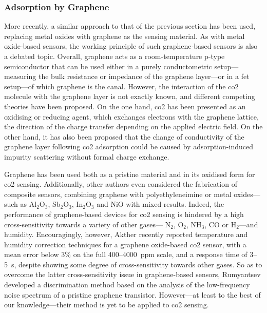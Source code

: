 \subsubsection{Adsorption by Graphene}\label{subsect:choos:review:graphene}

More recently, a similar approach to that of the previous section has been used, replacing metal oxides with graphene as the sensing material\cite{amin2014, singh2017}. As with metal oxide-based sensors, the working principle of such graphene-based sensors is also a debated topic. Overall, graphene acts as a room-temperature p-type semiconductor that can be used either in a purely conductometric setup---measuring the bulk resistance or impedance of the graphene layer\cite{yoon2011, zhou2014, akhter2021}---or in a \gls{fet} setup---of which graphene is the canal\cite{lu2009}. However, the interaction of the \gls{co2} molecule with the graphene layer is not exactly known, and different competing theories have been proposed. On the one hand, \gls{co2} has been presented as an oxidising or reducing agent, which exchanges electrons with the graphene lattice, the direction of the charge transfer depending on the applied electric field\cite{muruganathan2015}. On the other hand, it has also been proposed that the change of conductivity of the graphene layer following \gls{co2} adsorption could be caused by adsorption-induced impurity scattering without formal charge exchange\cite{sun2016}.

Graphene has been used both as a pristine material\cite{yoon2011, chen2012, smith2017, fan2018} and in its oxidised form\cite{zaki2019, akhter2021} for \gls{co2} sensing. Additionally, other authors even considered the fabrication of composite sensors, combining graphene with polyethyleneimine\cite{zhou2014} or metal oxides---such as Al$_2$O$_3$\cite{nemade2014b}, Sb$_2$O$_3$\cite{nemade2014a}, In$_2$O$_3$ and NiO\cite{amarnath2021} with mixed results. Indeed, the performance of graphene-based devices for \gls{co2} sensing is hindered by a high cross-sensitivity towards a variety of other gases---\eg{} N$_2$, O$_2$, NH$_3$, CO or H$_2$\cite{chen2012, smith2017, akhter2021}---and humidity\cite{smith2017, fan2018, shaban2019}. Encouragingly, however, Akther \etal{}\cite{akhter2021} recently reported temperature and humidity correction techniques for a graphene oxide-based \gls{co2} sensor, with a mean error below 3\% on the full 400--4000~ppm scale, and a response time of 3--5~s, despite showing some degree of cross-sensitivity towards other gases. So as to overcome the latter cross-sensitivity issue in graphene-based sensors, Rumyantsev \etal{}\cite{rumyantsev2012} developed a discrimination method based on the analysis of the low-frequency noise spectrum of a pristine graphene transistor. However---at least to the best of our knowledge---their method is yet to be applied to \gls{co2} sensing.

